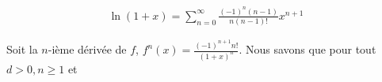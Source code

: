 \documentclass{report}
\begin{document}
\begin{multicols*}{2}
      \begin{align*}
          \ln(1 + x) = \sum_{n=0}^{\infty }\frac{(-1)^n(n-1)}{n(n-1)!} 
                      x^{n + 1}
      \end{align*}      

      Soit la $n$-ième dérivée de $f$, 
      $f^{n}(x) = \frac{(-1)^{n+1}n!}{(1 + x)^n}$. Nous savons que 
      pour tout $d > 0, n \geq 1$ et 





















  








 









\end{multicols*}
\end{document}
